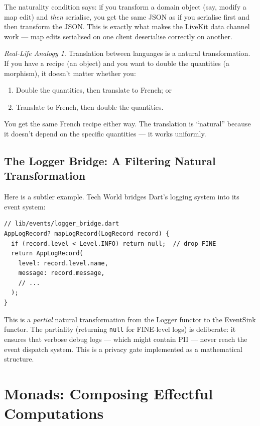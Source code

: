 \documentclass[12pt,a4paper]{article}
\theoremstyle{definition}
\theoremstyle{plain}
\theoremstyle{remark}
\newtheorem*{reallife}{Real-Life Analogy}
\begin{document}
The naturality condition says: if you transform a domain object
(say, modify a map edit) and \emph{then} serialise, you get the same
JSON as if you serialise first and then transform the JSON.
This is exactly what makes the LiveKit data channel work ---
map edits serialised on one client deserialise correctly on another.

\begin{reallife}
Translation between languages is a natural transformation.
If you have a recipe (an object) and you want to double the quantities
(a morphism), it doesn't matter whether you:
\begin{enumerate}
  \item Double the quantities, then translate to French; or
  \item Translate to French, then double the quantities.
\end{enumerate}
You get the same French recipe either way.
The translation is ``natural'' because it doesn't depend on the
specific quantities --- it works uniformly.
\end{reallife}

\subsection{The Logger Bridge: A Filtering Natural Transformation}

Here is a subtler example. Tech World bridges Dart's logging system into
its event system:

\begin{lstlisting}
// lib/events/logger_bridge.dart
AppLogRecord? mapLogRecord(LogRecord record) {
  if (record.level < Level.INFO) return null;  // drop FINE
  return AppLogRecord(
    level: record.level.name,
    message: record.message,
    // ...
  );
}
\end{lstlisting}

This is a \emph{partial} natural transformation from the Logger functor to
the EventSink functor. The partiality (returning \texttt{null} for
FINE-level logs) is deliberate: it ensures that verbose debug logs
--- which might contain PII --- never reach the event dispatch system.
This is a privacy gate implemented as a mathematical structure.


\section{Monads: Composing Effectful Computations}
\label{sec:monads}
\end{document}
